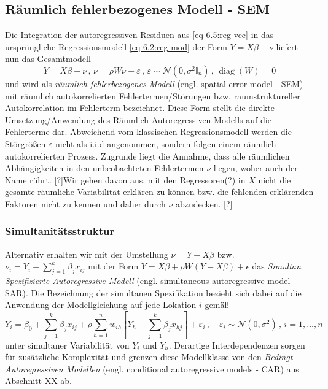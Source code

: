 \subsection{Räumlich fehlerbezogenes Modell - SEM}

Die Integration der autoregressiven Residuen aus \eqref{eq-6.5:reg-vec} in das ursprüngliche 
Regressionsmodell \eqref{eq-6.2:reg-mod} der Form $Y=X \beta + \nu$ liefert nun das 
Gesamtmodell 
\begin{equation} \label{eq-6.7:sem-mod}
    Y=X \beta + \nu \, , \, \nu=\rho W \nu + \varepsilon \, , \, 
    \varepsilon \sim \mathcal{N}(0,\sigma^{2} \mathds{I}_{n}) \, , \, 
    \operatorname{diag}(W)=0
\end{equation}
und wird als \emph{räumlich fehlerbezogenes Modell} 
(engl. spatial error model - SEM) mit räumlich autokorrelierten Fehlertermen/Störungen bzw. 
raumstruktureller Autokorrelation im Fehlerterm bezeichnet. 
Diese Form stellt die direkte Umsetzung/Anwendung des Räumlich Autoregressiven Modells auf die Fehlerterme 
dar. Abweichend vom klassischen Regressionsmodell werden die Störgrößen $\varepsilon$ nicht 
als i.i.d angenommen, sondern folgen einem räumlich autokorrelierten Prozess.
Zugrunde liegt die Annahme, dass alle räumlichen Abhängigkeiten in den 
unbeobachteten Fehlertermen $\nu$ liegen, woher auch der Name rührt. 
[?]Wir gehen davon aus, mit den Regressoren(?) in $X$ nicht die gesamte 
räumliche Variabilität erklären zu können bzw. die fehlenden 
erklärenden Faktoren nicht zu kennen und daher durch $\nu$ abzudecken. [?]

\subsubsection{Simultanitätsstruktur}

Alternativ erhalten wir mit der Umstellung $\nu=Y-X \beta$ 
bzw. $\nu_{i}=Y_{i}-\sum_{j=1}^{k} \beta_{j} x_{ij}$ mit der 
Form $Y=X \beta + \rho W (Y-X \beta) + \epsilon$ das \emph{Simultan Spezifizierte Autoregressive Modell} 
(engl. simultaneous autoregressive model -SAR). Die Bezeichnung 
der \glqq simultanen Spezifikation \grqq{} bezieht sich dabei auf die Anwendung der Modellgleichung auf 
jede Lokation $i$ gemäß
\begin{equation}
    Y_i = \beta_{0} + \sum_{j=1}^{k} 
    \beta_{j} x_{ij} + \rho \sum_{h=1}^{n} w_{ih} \left[ Y_{h}- \sum_{j=1}^{k} \beta_{j} x_{hj} \right] + \varepsilon_{i} \, , \quad
    \varepsilon_{i} \sim \mathcal{N}(0,\sigma^{2}) \, , \, i=1,\ldots,n
\end{equation}
unter simultaner Variabilität von $Y_{i}$ und $Y_{h}$. Derartige Interdependenzen sorgen für zusätzliche Komplexität 
und grenzen diese Modellklasse von den \emph{Bedingt Autoregressiven Modellen} 
(engl. conditional autoregressive models - CAR) aus Abschnitt XX ab.

